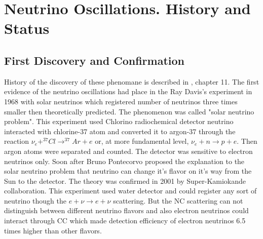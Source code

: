 \section{Neutrino Oscillations. History and Status}
\subsection{First Discovery and Confirmation}
History of the discovery of these phenomane is described in \cite{ref_Griffiths}, chapter 11. The first evidence of the neutrino oscillations had place in the Ray Davis's experiment in 1968 with solar neutrinos which registered number of neutrinos three times smaller then theoretically predicted. The phenomenon was called "solar neutrino problem". This experiment used Chlorino radiochemical detector neutrino interacted with chlorine-37 atom and converted it to argon-37 through the reaction $\nu_e+^{37}Cl \rightarrow ^{37}Ar+e$ or, at more fundamental level, $\nu_e+n \rightarrow p+e$. Then argon atoms were separated and counted. The detector was sensitive to electron neutrinos only. Soon after Bruno Pontecorvo proposed the explanation to the solar neutrino problem that neutrino can change it's flavor on it's way from the Sun to the detector. The theory was confirmed in 2001 by Super-Kamiokande collaboration. This experiment used water detector and could register any sort of neutrino though the $e+\nu \rightarrow e+\nu$ scattering. But the NC scattering can not distinguish between different neutrino flavors and also electron neutrinos could interact through CC which made detection efficiency of electron neutrinos 6.5 times higher than other flavors. \\

